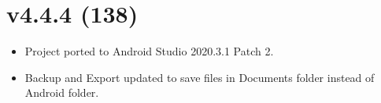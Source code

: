 \documentclass{article}
\begin{document}
    \section{v4.4.4 (138)}\label{sec:138}
    \begin{itemize}
        \item Project ported to Android Studio 2020.3.1 Patch 2.
        \item Backup and Export updated to save files in Documents folder instead of Android folder.
    \end{itemize}
\end{document}
